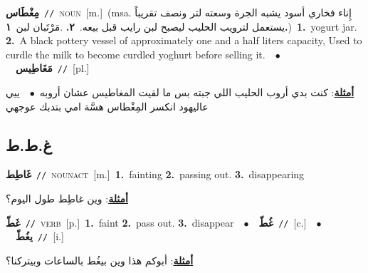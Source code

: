 \documentclass[10pt,a4paper,twoside]{article} %
\begin{document}
\begin{multicols}{2}
{\setlength\topsep{0pt}\textbf{\foreignlanguage{arabic}{مِغْطَاس}}\ {\color{gray}\texttt{//}\color{black}}\ \textsc{noun}\ [m.]\ \color{gray}(msa. \foreignlanguage{arabic}{إِناء فخاري أسود يشبه الجرة وسعته لتر ونصف تقريباً يستعمل لترويب الحليب ليصبح لبن رايب قبل بيعه.}~\foreignlanguage{arabic}{\textbf{٢.}}  .\foreignlanguage{arabic}{مَرْتَبان لبن}~\foreignlanguage{arabic}{\textbf{١.}})\color{black}\ \textbf{1.}~yogurt jar.  \textbf{2.}~A black pottery vessel of approximately one and a half liters capacity, Used to curdle the milk to become curdled yoghurt before selling it.\ \ $\bullet$\ \ \setlength\topsep{0pt}\textbf{\foreignlanguage{arabic}{مَغَاطِيس}}\ {\color{gray}\texttt{//}\color{black}}\ [pl.]\  \begin{flushright}\color{gray}\foreignlanguage{arabic}{\textbf{\underline{\foreignlanguage{arabic}{أمثلة}}}: كنت بدي أروب الحليب اللي جبته بس ما لقيت المغاطيس عشان أروبه\ $\bullet$\ \  ييي عاليهود انكسر المِغْطاس هسَّة امي بتدبك عوجهي}\end{flushright}\color{black}} \vspace{2mm}

\vspace{-3mm}
\subsection*{\color{blue}\foreignlanguage{arabic}{غ.ط.ط}\color{blue}{}} 

{\setlength\topsep{0pt}\textbf{\foreignlanguage{arabic}{غَاطِط}}\ {\color{gray}\texttt{//}\color{black}}\ \textsc{noun\textunderscore act}\ [m.]\ \textbf{1.}~fainting  \textbf{2.}~passing out.  \textbf{3.}~disappearing\  \begin{flushright}\color{gray}\foreignlanguage{arabic}{\textbf{\underline{\foreignlanguage{arabic}{أمثلة}}}: وين غاطِط طول اليوم؟}\end{flushright}\color{black}} \vspace{2mm}

{\setlength\topsep{0pt}\textbf{\foreignlanguage{arabic}{غَطّ}}\ {\color{gray}\texttt{//}\color{black}}\ \textsc{verb}\ [p.]\ \textbf{1.}~faint  \textbf{2.}~pass out.  \textbf{3.}~disappear\ \ $\bullet$\ \ \setlength\topsep{0pt}\textbf{\foreignlanguage{arabic}{غُطّ}}\ {\color{gray}\texttt{//}\color{black}}\ [c.]\ \ $\bullet$\ \ \setlength\topsep{0pt}\textbf{\foreignlanguage{arabic}{يغُطّ}}\ {\color{gray}\texttt{//}\color{black}}\ [i.]\  \begin{flushright}\color{gray}\foreignlanguage{arabic}{\textbf{\underline{\foreignlanguage{arabic}{أمثلة}}}: أبوكم هذا وين بيغُط بالساعات وبيتركنا؟}\end{flushright}\color{black}} \vspace{2mm}


\end{multicols}
\end{document}
